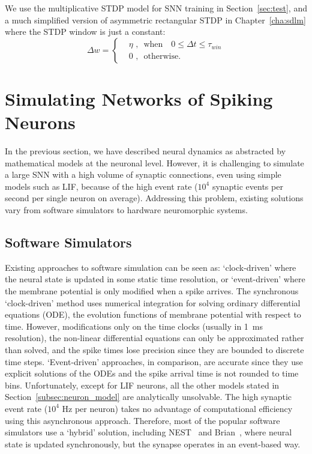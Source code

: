 We use the multiplicative STDP model for SNN training in Section~\ref{sec:test}, and a much simplified version of asymmetric rectangular STDP in Chapter~\ref{cha:sdlm} where the STDP window is just a constant:
\begin{equation}
\Delta w = \left\{
\begin{aligned}
&\eta \textrm{~,~~when~~~} 0 \leq \Delta  t \leq \tau_{win}\\
& 0 \textrm{~,~~otherwise}.
\end{aligned}
\right.
\end{equation}

\section{Simulating Networks of Spiking Neurons}
\label{sec:snn_sim}
In the previous section, we have described neural dynamics as abstracted by mathematical models at the neuronal level.
However, it is challenging to simulate a large SNN with a high volume of synaptic connections, even using simple models such as LIF, because of the high event rate ($10^4$ synaptic events per second per single neuron on average).
Addressing this problem, existing solutions vary from software simulators to hardware neuromorphic systems.

\subsection{Software Simulators}
Existing approaches to software simulation can be seen as: `clock-driven' where the neural state is updated in some static time resolution, or `event-driven' where the membrane potential is only modified when a spike arrives.
The synchronous `clock-driven' method uses numerical integration for solving ordinary differential equations (ODE), the evolution functions of membrane potential with respect to time.
However, modifications only on the time clocks (usually in 1~ms resolution), the non-linear differential equations can only be approximated rather than solved, and the spike times lose precision since they are bounded to discrete time steps.
`Event-driven' approaches, in comparison, are accurate since they use explicit solutions of the ODEs and the spike arrival time is not rounded to time bins.
Unfortunately, except for LIF neurons, all the other models stated in Section~\ref{subsec:neuron_model} are analytically unsolvable.
The high synaptic event rate ($10^4$ Hz per neuron) takes no advantage of computational efficiency using this asynchronous approach.
Therefore, most of the popular software simulators use a `hybrid' solution, including NEST~\citep{gewaltig2007nest} and Brian~\citep{goodman2008brian}, where 
neural state is updated synchronously, but the synapse operates in an event-based way.

